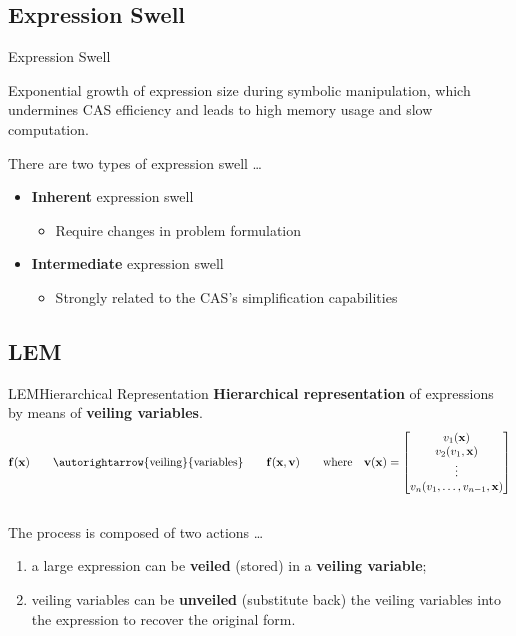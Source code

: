 \subsection{Expression Swell}
\begin{frame}{Expression Swell}
  \begin{bbox}
    Exponential growth of expression size during symbolic manipulation, which undermines \ac{CAS} efficiency and leads to high memory usage and slow computation.
  \end{bbox}
  \vspace{1.0em}
  There are two types of expression swell \dots
  \begin{itemize}
    \item \textbf{Inherent} expression swell
    \begin{itemize}
      \item[] Require changes in problem formulation
    \end{itemize}
    \item \textbf{Intermediate} expression swell
    \begin{itemize}
      \item[] Strongly related to the \ac{CAS}'s simplification capabilities
    \end{itemize}
  \end{itemize}
\end{frame}

\subsection{\acl{LEM}}

\begin{frame}{\acl{LEM}}{Hierarchical Representation}
  \textbf{Hierarchical representation} of expressions by means of \textbf{veiling variables}.
  \begin{equation*}
    \m{f}(\mx) \qquad \autorightarrow{\text{veiling}}{\text{variables}} \qquad \m{f}(\mx, \m{v}) \qquad \text{where} \quad \m{v}(\mx) = \begin{bmatrix}
      v_{1}(\mx) \\
      v_{2}(v_{1}, \mx) \\
      \vdots \\
      v_{n}(v_{1}, \dots, v_{n-1}, \mx)
    \end{bmatrix}
  \end{equation*}
  \vspace{1.0em} \\
  The process is composed of two actions \dots
  \begin{enumerate}
    \item a large expression can be \textbf{veiled} (stored) in a \textbf{veiling variable};
    \item veiling variables can be \textbf{unveiled} (substitute back) the veiling variables into the expression to recover the original form.
  \end{enumerate}
  \vspace{1.0em}
\end{frame}


